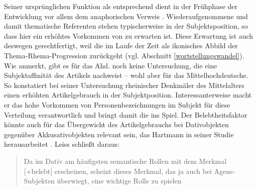 Seiner ursprünglichen Funktion als  entsprechend dient  in der Frühphase der Entwicklung vor allem dem anaphorischen  Verweis \parencite[s. u.a.][]{Jager1917,Oubouzar1992,Leiss2000}. Wiederaufgenommene und damit thematische Referenten  stehen typischerweise in der  Subjektsposition, so dass hier ein erhöhtes Vorkommen von  zu erwarten ist. Diese Erwartung ist auch deswegen gerechtfertigt, weil die  im Laufe der Zeit als ikonisches Abbild der Thema-Rhema-Progression  zurückgeht (vgl. Abschnitt \ref{wortstellungswandel}). Wie  \textcite[165]{Leiss2000} anmerkt, gibt es für das Ahd. noch keine Untersuchung, die eine Subjektaffinität des Artikels nachweist -- wohl aber für das Mittelhochdeutsche. So konstatiert \textcite[33--35]{Hartmann1967} bei seiner Untersuchung rheinischer Denkmäler des Mittelalters einen erhöhten Artikelgebrauch in der  Subjektposition. Interessanterweise macht er das hohe Vorkommen von Personenbezeichnungen im Subjekt für diese Verteilung verantwortlich und bringt damit die  ins Spiel. Der Belebtheitsfaktor könnte auch für das Übergewicht des Artikelgebrauchs bei Dativobjekten  gegenüber Akkusativobjekten relevant sein, das Hartmann in seiner Studie herausarbeitet \parencite[42--43]{Hartmann1967}. Leiss schließt daraus: \blockcquote[165]{Leiss2000}{Da im Dativ am häufigsten semantische Rollen  mit dem Merkmal [+belebt]  erscheinen,
scheint dieses Merkmal, das ja auch bei Agens-Subjekten   überwiegt, eine wichtige Rolle zu spielen}. 

